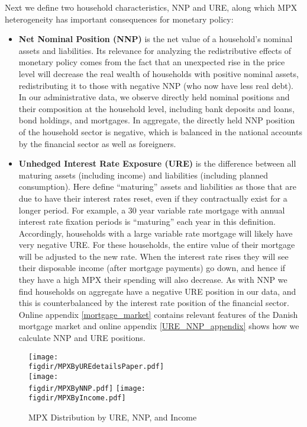 \documentclass[titlepage]{\econtex}\newcommand{\texname}{ConsumptionHeterogeneity}
\newcommand{\figdir}{../Code/Rcode/Figures/AEJ_revision}
\begin{document}
	Next we define two household characteristics, NNP and URE, along which MPX heterogeneity has important consequences for monetary policy:
	\begin{itemize}
		\item \textbf{Net Nominal Position (NNP)} is the net value of a household's nominal assets and liabilities. Its relevance for analyzing the redistributive effects of monetary policy comes from the fact that an unexpected rise in the price level will decrease the real wealth of households with positive nominal assets, redistributing it to those with negative NNP (who now have less real debt). In our administrative data, we observe directly held nominal positions and their composition at the household level, including bank deposits and loans, bond holdings, and mortgages. In aggregate, the directly held NNP position of the household sector is negative, which is balanced in the national accounts by the financial sector as well as foreigners.
		\item \textbf{Unhedged Interest Rate Exposure (URE)} is the difference between all maturing assets (including income) and liabilities (including planned consumption). Here define ``maturing'' assets and liabilities as those that are due to have their interest rates reset, even if they contractually exist for a longer period. For example, a 30 year variable rate mortgage with annual interest rate fixation periods is ``maturing'' each year in this definition. Accordingly, households with a large variable rate mortgage will likely have very negative URE. For these households, the entire value of their mortgage will be adjusted to the new rate. When the interest rate rises they will see their disposable income (after mortgage payments) go down, and hence if they have a high MPX their spending will also decrease. As with NNP we find households on aggregate have a negative URE position in our data, and this is counterbalanced by the interest rate position of the financial sector. Online appendix \ref{mortgage_market} contains relevant features of the Danish mortgage market and online appendix \ref{URE_NNP_appendix} shows how we calculate NNP and URE positions.
	\end{itemize}
	
	\begin{figure} 
		\begin{centering}
			\texttt{[image: \\figdir/MPXByUREdetailsPaper.pdf]} \\
			\texttt{[image: \\figdir/MPXByNNP.pdf]}
			\texttt{[image: \\figdir/MPXByIncome.pdf]}
			\caption{MPX Distribution by URE, NNP, and Income}
			\label{fig:MPCAuclert}
		\end{centering}
	\end{figure}
	
\end{document}
